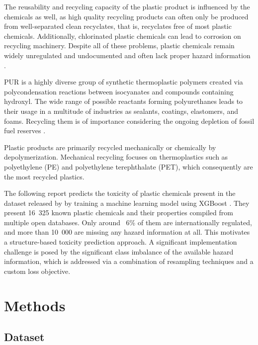 \documentclass[hidelinks,11pt]{article}
\begin{document}
The reusability and recycling capacity of the plastic product is influenced by the chemicals as well, 
as high quality recycling products can often only be produced from 
well-separated clean recyclates, that is, recyclates free of most plastic chemicals.
Additionally, chlorinated plastic chemicals can lead to corrosion on recycling machinery.
Despite all of these problems, plastic chemicals remain widely unregulated and undocumented and 
often lack proper hazard information \parencite{wagnerStateSciencePlastic2025}.

PUR is a highly diverse group of synthetic thermoplastic polymers created via polycondensation 
reactions between isocyanates and compounds containing hydroxyl. 
The wide range of possible reactants forming polyurethanes leads to their usage in a multitude 
of industries as sealants, coatings, elastomers, and foams.
Recycling them is of importance considering the ongoing depletion of fossil fuel reserves 
\parencite{rossignoloRecyclingPolyurethanesWhere2024}. 

Plastic products are primarily recycled mechanically or chemically by depolymerization. 
Mechanical recycling focuses on thermoplastics such as polyethylene (PE) and polyethylene 
terephthalate (PET), which consequently are the most recycled plastics.


The following report predicts the toxicity of plastic chemicals present in the dataset 
released by \cite{wagnerStateSciencePlastic2025} by training a machine learning model using 
XGBoost \parencite{chenXGBoostScalableTree2016}.
They present 16~325 known plastic chemicals and their properties compiled from multiple open databases.
Only around ~6\% of them are internationally regulated, and more than 10~000 are missing any 
hazard information at all.
This motivates a structure-based toxicity prediction approach.
A significant implementation challenge is posed by the significant class imbalance
of the available hazard information, 
which is addressed via a combination of resampling techniques and a custom loss objective.

\newpage
\section{Methods}
\subsection{Dataset} \label{sec:dataset}
\end{document}
